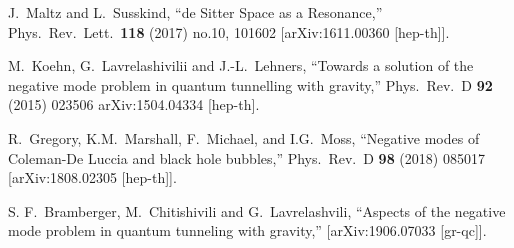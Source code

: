 \documentclass[11pt,a4paper]{article}
\begin{document}
\begin{thebibliography}{99}
  J.~Maltz and L.~Susskind,
  ``de Sitter Space as a Resonance,''
  Phys.\ Rev.\ Lett.\  {\bf 118} (2017) no.10,  101602
  [arXiv:1611.00360 [hep-th]]. 
  
  
  M.~Koehn,  G.~Lavrelashivilii and J.-L.~Lehners,
  ``Towards a solution of the negative mode problem in quantum tunnelling with gravity,'' 
  Phys.\ Rev.\ D {\bf 92} (2015) 023506
  arXiv:1504.04334 [hep-th]. 
  
 R.~Gregory,   K.M.~Marshall, F.~Michael, and I.G.~Moss,
  ``Negative modes of Coleman-De Luccia and black hole bubbles,''
  Phys.\ Rev.\ D {\bf 98} (2018) 085017 
  [arXiv:1808.02305 [hep-th]].
  
  S. F.~Bramberger,   M.~Chitishivili and G.~Lavrelashvili,
  ``Aspects of the negative mode problem in quantum tunneling with gravity,''
  [arXiv:1906.07033 [gr-qc]]. 
  
\end{thebibliography}
\end{document}
